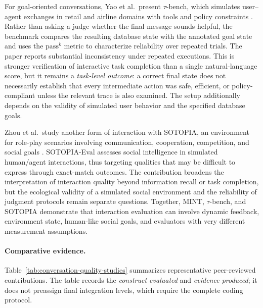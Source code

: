 For goal-oriented conversations, Yao et al.\ present $\tau$-bench, which simulates user--agent exchanges in retail and airline domains with tools and policy constraints \cite{yao2025taubench}. Rather than asking a judge whether the final message sounds helpful, the benchmark compares the resulting database state with the annotated goal state and uses the $\mathrm{pass}^{k}$ metric to characterize reliability over repeated trials. The paper reports substantial inconsistency under repeated executions. This is stronger verification of interactive task completion than a single natural-language score, but it remains a \emph{task-level outcome}: a correct final state does not necessarily establish that every intermediate action was safe, efficient, or policy-compliant unless the relevant trace is also examined. The setup additionally depends on the validity of simulated user behavior and the specified database goals.

Zhou et al.\ study another form of interaction with SOTOPIA, an environment for role-play scenarios involving communication, cooperation, competition, and social goals \cite{zhou2024sotopia}. SOTOPIA-Eval assesses social intelligence in simulated human/agent interactions, thus targeting qualities that may be difficult to express through exact-match outcomes. The contribution broadens the interpretation of interaction quality beyond information recall or task completion, but the ecological validity of a simulated social environment and the reliability of judgment protocols remain separate questions. Together, MINT, $\tau$-bench, and SOTOPIA demonstrate that interaction evaluation can involve dynamic feedback, environment state, human-like social goals, and evaluators with very different measurement assumptions.

\paragraph{Comparative evidence.}
Table~\ref{tab:conversation-quality-studies} summarizes representative peer-reviewed contributions. The table records the \emph{construct evaluated} and \emph{evidence produced}; it does not preassign final integration levels, which require the complete coding protocol.

